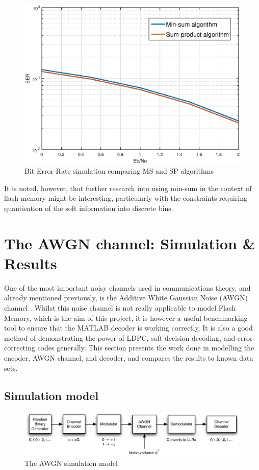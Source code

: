 \documentclass[11pt]{article}
\numberwithin{equation}{subsection}
\begin{document}
\begin{figure}[h]
\centering
\includegraphics[scale=0.65]{min_sum_graph}
\caption{Bit Error Rate simulation comparing MS and SP algorithms}
\label{figure:min_sum}
\end{figure}

It is noted, however, that further research into using min-sum in the context of flash memory might be interesting, particularly with the constraints requiring quantisation of the soft information into discrete bins. 

\section{The AWGN channel: Simulation \& Results} \label{section:awgn_sim}
One of the most important noisy channels used in communications theory, and already mentioned previously, is the Additive White Gaussian Noise (AWGN) channel \cite{tse2005fundamentals,proakis2001digital,haykin2008communication,johnson2009iterative}. Whilst this noise channel is not really applicable to model Flash Memory, which is the aim of this project, it is however a useful benchmarking tool to ensure that the MATLAB decoder is working correctly. It is also a good method of demonstrating the power of LDPC, soft decision decoding, and error-correcting codes generally. This section presents the work done in modelling the encoder, AWGN channel, and decoder, and compares the results to known data sets.

\subsection{Simulation model}
\begin{figure}[h]
\centering
\includegraphics[scale=0.878]{awgn_channel_model}
\caption{The AWGN simulation model}
\label{figure:awgn sim model}
\end{figure}
\end{document}
